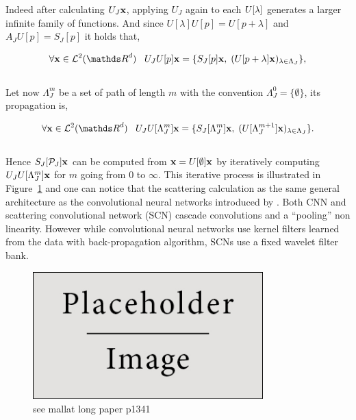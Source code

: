 \documentclass[a4paper,11pt]{report}
\begin{document}
			Indeed after calculating $U_{J}{\bf x}$, applying $U_{J}$ again to each $U[\lambda]\bf$ generates a larger infinite family of functions. And since $U[\lambda]U[p] = U[p+\lambda]$ and $ A_{J}U[p] = S_{J}[p]$ it holds that,
			
			\begin{equation}
					\forall \bfx \in \mcalL^{2}(\dsR^{d}) \;\;\; U_{J}U[p] \bfx = \{ S_{J}[p]\bfx , \; (U[p+\lambda]\bfx)_{\lambda \in \Lambda_{J}} \},
					\label{eq:SCN propagation 1}
			\end{equation}\\
			
			Let now $\Lambda_{J}^{m}$ be a set of path of length $m$ with the convention $\Lambda_{J}^{0} = \{ \emptyset \}$, its propagation is,
			
			\begin{equation}
					\forall \bfx \in \mcalL^{2}(\dsR^{d}) \;\;\; U_{J}U[\Lambda_{J}^{m}] \bfx = \{ S_{J}[\Lambda_{J}^{m}]\bfx , \; (U[\Lambda_{J}^{m+1}]\bfx)_{\lambda \in \Lambda_{J}} \}.
					\label{eq:SCN propagation 2}
			\end{equation}\\
			
			
			
			Hence $S_{J}[\mathcal{P}_{J}]{\bf x}$ can be computed from ${\bf x}= U[\emptyset]{\bf x}$ by iteratively computing $U_{J}U[\Lambda_{J}^{m}] {\bf x}$ for $m$ going from $0$ to $\infty$. This iterative process is illustrated in Figure~\ref{fig:SCN} and one can notice that the scattering calculation as the same general architecture as the convolutional neural networks introduced by \cite{lecun1995convolutional}. Both CNN and scattering convolutional network (SCN) cascade convolutions and a ``pooling'' non linearity. However while convolutional neural networks use kernel filters learned from the data with back-propagation algorithm, SCNs use a fixed wavelet filter bank. 

      \begin{figure}
				\begin{center}
					\includegraphics[width=3.5in]{placeholder.jpg}
					\caption[The scattering convolutional network architecture]{see mallat long paper p1341}
					\label{fig:SCN}
				\end{center}	
      \end{figure}
      
\end{document}
